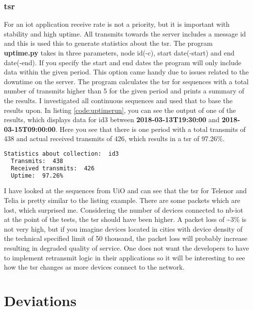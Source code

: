 \documentclass[USenglish]{ifimaster}  %
\begin{document}
\subsection[\acrlong{tsr}]{\acrfull{tsr}}
For an \acrshort{iot} application receive rate is not a priority, but it is important with stability and high uptime. All transmits towards the server includes a message id and this is used this to generate statistics about the \acrshort{tsr}. The program \textbf{uptime.py} takes in three parameters, node id(-c), start date(-start) and end date(-end). If you specify the start and end dates the program will only include data within the given period. This option came handy due to issues related to the downtime on the server.
The program calculates the \acrshort{tsr} for sequences with a total number of transmits higher than 5 for the given period and prints a summary of the results. I investigated all continuous sequences and used that to base the results upon. In listing \vref{code:uptimerun}, you can see the output of one of the results, which displays data for id3 between \textbf{2018-03-13T19:30:00} and \textbf{2018-03-15T09:00:00}. Here you see that there is one period with a total transmits of 438 and actual received transmits of 426, which results in a \acrshort{tsr} of 97.26\%.

\begin{lstlisting}[caption={Example of uptime.py}, label={code:uptimerun}, language=Bash]
  Statistics about collection:  id3
  Transmits:  438
  Received transmits:  426
  Uptime:  97.26%
\end{lstlisting}

I have looked at the sequences from UiO and can see that the \acrshort{tsr} for Telenor and Telia is pretty similar to the listing example. There are some packets which are lost, which surprised me. Considering the number of devices connected to \acrshort{nb-iot} at the point of the tests, the \acrshort{tsr} should have been higher. A packet loss of \textasciitilde3\% is not very high, but if you imagine devices located in cities with device density of the technical specified limit of 50 thousand, the packet loss will probably increase resulting in degraded quality of service. One does not want the developers to have to implement retransmit logic in their applications so it will be interesting to see how the \acrshort{tsr} changes as more devices connect to the network.

\chapter{Deviations} \label{section:deviations}
\end{document}
